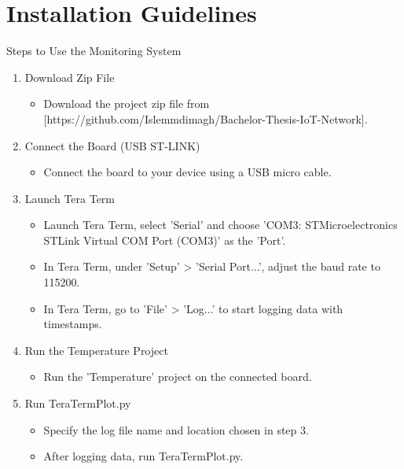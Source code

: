 \appendix

\chapter{Installation Guidelines}
Steps to Use the Monitoring System

\begin{enumerate}
    \item Download Zip File
    \begin{itemize}
    \item Download the project zip file from [https://github.com/Islemmdimagh/Bachelor-Thesis-IoT-Network].
    \end{itemize}
    \item Connect the Board (USB ST-LINK)
    \begin{itemize}
    \item Connect the board to your device using a USB micro cable.
    \end{itemize}
    \item Launch Tera Term
    \begin{itemize}
    \item Launch Tera Term, select 'Serial' and choose 'COM3: STMicroelectronics STLink Virtual COM Port (COM3)' as the 'Port'.
    \end{itemize}
    \begin{itemize}
    \item In Tera Term, under 'Setup' > 'Serial Port...', adjust the baud rate to 115200.
    \end{itemize}
    \begin{itemize}
    \item In Tera Term, go to 'File' > 'Log...' to start logging data with timestamps.
    \end{itemize}
    \item Run the Temperature Project
    \begin{itemize}
    \item Run the 'Temperature' project on the connected board.
    \end{itemize}
    \item Run TeraTermPlot.py
    \begin{itemize}
    \item Specify the log file name and location chosen in step 3.
    \item After logging data, run TeraTermPlot.py.
    \end{itemize}
\end{enumerate}
